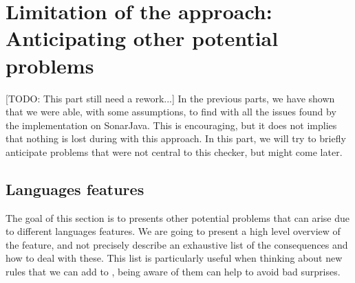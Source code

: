 \section{Limitation of the approach: Anticipating other potential problems}
\label{sec:anticipating_problems}
[TODO: This part still need a rework...] \newline
In the previous parts, we have shown that we were able, with some assumptions, to find with \slang{} all the issues found by the implementation on SonarJava. 
This is encouraging, but it does not implies that nothing is lost during with this approach.
In this part, we will try to briefly anticipate problems that were not central to this checker, but might come later.

\subsection{Languages features}
\label{subsec:other_language_features}

The goal of this section is to presents other potential problems that can arise due to different languages features. We are going to present a high level overview of the feature, and not precisely describe an exhaustive list of the consequences and how to deal with these.
This list is particularly useful when thinking about new rules that we can add to \slang, being aware of them can help to avoid bad surprises.

